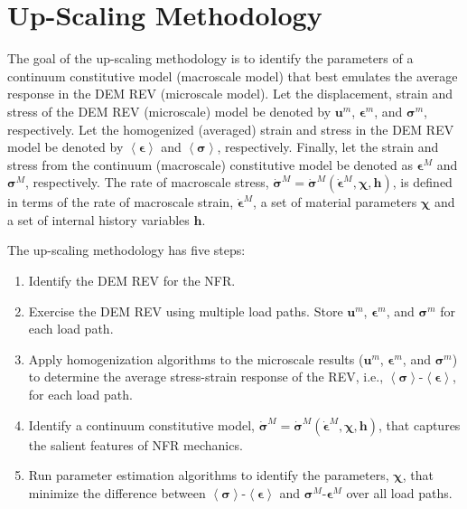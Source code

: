 \chapter{Up-Scaling Methodology}

The goal of the up-scaling methodology is to identify the parameters of a continuum constitutive model (macroscale model) that best emulates the average response in the DEM REV (microscale model). Let the displacement, strain and stress of the DEM REV (microscale) model be denoted by $\mathbf{u}^m$, $\boldsymbol{\epsilon}^m$, and $\boldsymbol{\sigma}^m$, respectively. Let the homogenized (averaged) strain and stress in the DEM REV model be denoted by  $\left<\boldsymbol{\epsilon}\right>$ and $\left<\boldsymbol{\sigma}\right>$, respectively.  Finally, let the strain and stress from the continuum (macroscale) constitutive model be denoted as $\boldsymbol{\epsilon}^M$ and $\boldsymbol{\sigma}^M$, respectively. The rate of macroscale stress, $\dot{\boldsymbol{\sigma}}^M=\dot{\boldsymbol{\sigma}}^M\left(\dot{\boldsymbol{\epsilon}}^M, \boldsymbol{\chi},\mathbf{h}\right)$, is defined in terms of the rate of macroscale strain, $\dot{\boldsymbol{\epsilon}}^M$, a set of material parameters $\boldsymbol{\chi}$ and a set of internal history variables $\mathbf{h}$.

The up-scaling methodology has five steps: 
\begin{enumerate}
    \item Identify the DEM REV for the NFR.
	\item Exercise the DEM REV using multiple load paths. Store $\mathbf{u}^m$, $\boldsymbol{\epsilon}^m$, and $\boldsymbol{\sigma}^m$ for each load path.
	\item Apply homogenization algorithms to the microscale results ($\mathbf{u}^m$, $\boldsymbol{\epsilon}^m$, and $\boldsymbol{\sigma}^m$) to determine the average stress-strain response of the REV, i.e., $\left<\boldsymbol{\sigma}\right>$-$\left<\boldsymbol{\epsilon}\right>$, for each load path.
	\item Identify a continuum constitutive model, $\dot{\boldsymbol{\sigma}}^M=\dot{\boldsymbol{\sigma}}^M\left(\dot{\boldsymbol{\epsilon}}^M, \boldsymbol{\chi},\mathbf{h}\right)$, that captures the salient features of NFR mechanics.
	\item Run parameter estimation algorithms to identify the parameters, $\boldsymbol{\chi}$, that minimize the difference between $\left<\boldsymbol{\sigma}\right>$-$\left<\boldsymbol{\epsilon}\right>$ and $\boldsymbol{\sigma}^M$-$\boldsymbol{\epsilon}^M$ over all load paths.
\end{enumerate}

